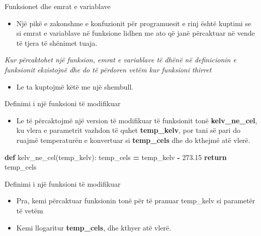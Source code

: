 \documentclass[
  ignorenonframetext,
]{beamer}
\newenvironment{Shaded}{\begin{snugshade}}{\end{snugshade}}
\newcommand{\ControlFlowTok}[1]{\textcolor[rgb]{0.13,0.29,0.53}{\textbf{#1}}}
\newcommand{\FloatTok}[1]{\textcolor[rgb]{0.00,0.00,0.81}{#1}}
\newcommand{\KeywordTok}[1]{\textcolor[rgb]{0.13,0.29,0.53}{\textbf{#1}}}
\newcommand{\NormalTok}[1]{#1}
\newcommand{\OperatorTok}[1]{\textcolor[rgb]{0.81,0.36,0.00}{\textbf{#1}}}
\providecommand{\tightlist}{%
  \setlength{\itemsep}{0pt}\setlength{\parskip}{0pt}}
\begin{document}
\begin{frame}{Funksionet dhe emrat e variablave}
\protect\hypertarget{funksionet-dhe-emrat-e-variablave}{}
\begin{itemize}
\tightlist
\item
  Një pikë e zakonshme e konfuzionit për programuesit e rinj është
  kuptimi se si emrat e variablave në funksione lidhen me ato që janë
  përcaktuar në vende të tjera të shënimet tuaja.
\end{itemize}

\emph{Kur përcaktohet një funksion, emrat e variablave të dhënë në
definicionin e funksionit ekzistojnë dhe do të përdoren vetëm kur
funksioni thirret}

\begin{itemize}
\tightlist
\item
  Le ta kuptojmë këtë me një shembull.
\end{itemize}
\end{frame}

\begin{frame}[fragile]{Definimi i një funksioni të modifikuar}
\protect\hypertarget{definimi-i-njuxeb-funksioni-tuxeb-modifikuar}{}
\begin{itemize}
\tightlist
\item
  Le të përcaktojmë një version të modifikuar të funksionit tonë
  \textbf{kelv\_ne\_cel}, ku vlera e parametrit vazhdon të quhet
  \textbf{temp\_kelv}, por tani së pari do ruajmë temperaturën e
  konvertuar si \textbf{temp\_cels} dhe do kthejmë atë vlerë.
\end{itemize}

\begin{Shaded}
\begin{Highlighting}[]
\KeywordTok{def}\NormalTok{ kelv\_ne\_cel(temp\_kelv):}
\NormalTok{    temp\_cels }\OperatorTok{=}\NormalTok{ temp\_kelv }\OperatorTok{{-}} \FloatTok{273.15}
    \ControlFlowTok{return}\NormalTok{ temp\_cels}
\end{Highlighting}
\end{Shaded}
\end{frame}

\begin{frame}{Definimi i një funksioni të modifikuar}
\protect\hypertarget{definimi-i-njuxeb-funksioni-tuxeb-modifikuar-1}{}
\begin{itemize}
\item
  Pra, kemi përcaktuar funksionin tonë për të pranuar temp\_kelv si
  parametër të vetëm
\item
  Kemi llogaritur \textbf{temp\_cels}, dhe kthyer atë vlerë.
\end{itemize}
\end{frame}
\end{document}
